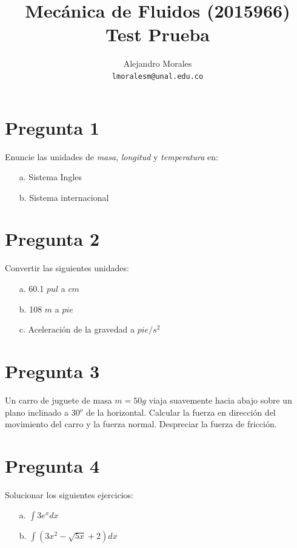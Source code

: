 \documentclass[11pt, oneside]{article}   	%
\title{\vspace{-3cm} Mec\'anica de Fluidos (2015966)\\Test Prueba \vspace{-0.7cm}}
\author{Alejandro Morales \\ \texttt{lmoralesm@unal.edu.co}}
\date{}							%
\begin{document}
\maketitle

\vspace{-1.1cm}
\section*{Pregunta 1}\vspace{-0.3cm}
Enuncie las unidades de \emph{masa}, \emph{longitud} y \emph{temperatura} en:
\begin{itemize}
\item[a.] Sistema Ingles
\item[b.] Sistema internacional
\end{itemize}
	

\section*{Pregunta 2}\vspace{-0.3cm}
Convertir las siguientes unidades:
\begin{itemize}
\item[a.] 60.1 $pul$ a $cm$ 
\item[b.] 108 $m$ a $pie$
\item[c.] Aceleraci\'on de la gravedad a $pie/s^2$
\end{itemize}
	
\section*{Pregunta 3}\vspace{-0.3cm}
Un carro de juguete de masa $m=50g$ viaja suavemente hacia abajo sobre un plano inclinado a 30$^o$ de la horizontal. Calcular la fuerza en direcci\'on del movimiento del carro y la fuerza normal. Despreciar la fuerza de fricci\'on.
	
\section*{Pregunta 4}\vspace{-0.3cm}
Solucionar los siguientes ejercicios:
\begin{itemize}
\item[a.] $\int 3e^x dx$ 
\item[b.] $\int (3x^2 - \sqrt{5x} +2) dx$
\end{itemize}
	
\end{document}
